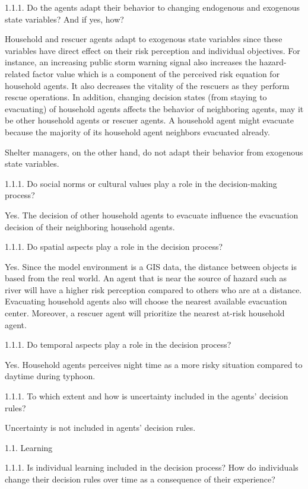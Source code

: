 \documentclass[runningheads]{llncs}
\begin{document}
1.1.1.	Do the agents adapt their behavior to changing endogenous and exogenous state variables? And if yes, how?

Household and rescuer agents adapt to exogenous state variables since these variables have direct effect on their risk perception and individual objectives. For instance, an increasing public storm warning signal also increases the hazard-related factor value which is a component of the perceived risk equation for household agents. It also decreases the vitality of the rescuers as they perform rescue operations. In addition, changing decision states (from staying to evacuating) of household agents affects the behavior of neighboring agents, may it be other household agents or rescuer agents. A household agent might evacuate because the majority of its household agent neighbors evacuated already.  

Shelter managers, on the other hand, do not adapt their behavior from exogenous state variables. 

1.1.1.	Do social norms or cultural values play a role in the decision-making process?

Yes. The decision of other household agents to evacuate influence the evacuation decision of their neighboring household agents. 

1.1.1.	Do spatial aspects play a role in the decision process?

Yes. Since the model environment is a GIS data, the distance between objects is based from the real world. An agent that is near the source of hazard such as river will have a higher risk perception compared to others who are at a distance. Evacuating household agents also will choose the nearest available evacuation center. Moreover, a rescuer agent will prioritize the nearest at-risk household agent.

1.1.1.	Do temporal aspects play a role in the decision process?

Yes. Household agents perceives night time as a more risky situation compared to daytime during typhoon.

1.1.1.	To which extent and how is uncertainty included in the agents’ decision rules?

Uncertainty is not included in agents’ decision rules.

1.1.	Learning

1.1.1.	Is individual learning included in the decision process? How do individuals change their decision rules over time as a consequence of their experience?
\end{document}
